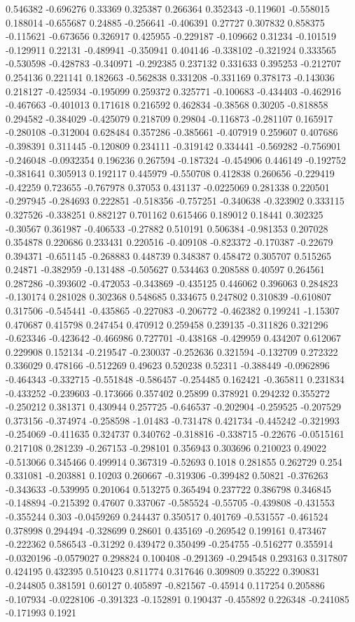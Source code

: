 0.546382 -0.696276 0.33369 0.325387 0.266364 0.352343 -0.119601 -0.558015 0.188014 -0.655687 0.24885 -0.256641 -0.406391 0.27727 0.307832 0.858375 -0.115621 -0.673656 0.326917 0.425955 -0.229187 -0.109662 0.31234 -0.101519 -0.129911 0.22131 -0.489941 -0.350941 0.404146 -0.338102 -0.321924 0.333565 -0.530598 -0.428783 -0.340971 -0.292385 0.237132 0.331633 0.395253 -0.212707 0.254136 0.221141 0.182663 -0.562838 0.331208 -0.331169 0.378173 -0.143036 0.218127 -0.425934 -0.195099 0.259372 0.325771 -0.100683 -0.434403 -0.462916 -0.467663 -0.401013 0.171618 0.216592 0.462834 -0.38568 0.30205 -0.818858 0.294582 -0.384029 -0.425079 0.218709 0.29804 -0.116873 -0.281107 0.165917 -0.280108 -0.312004 0.628484 0.357286 -0.385661 -0.407919 0.259607 0.407686 -0.398391 0.311445 -0.120809 0.234111 -0.319142 0.334441 -0.569282 -0.756901 -0.246048 -0.0932354 0.196236 0.267594 -0.187324 -0.454906 0.446149 -0.192752 -0.381641 0.305913 0.192117 0.445979 -0.550708 0.412838 0.260656 -0.229419 -0.42259 0.723655 -0.767978 0.37053 0.431137 -0.0225069 0.281338 0.220501 -0.297945 -0.284693 0.222851 -0.518356 -0.757251 -0.340638 -0.323902 0.333115 0.327526 -0.338251 0.882127 0.701162 0.615466 0.189012 0.18441 0.302325 -0.30567 0.361987 -0.406533 -0.27882 0.510191 0.506384 -0.981353 0.207028 0.354878 0.220686 0.233431 0.220516 -0.409108 -0.823372 -0.170387 -0.22679 0.394371 -0.651145 -0.268883 0.448739 0.348387 0.458472 0.305707 0.515265 0.24871 -0.382959 -0.131488 -0.505627 0.534463 0.208588 0.40597 0.264561 0.287286 -0.393602 -0.472053 -0.343869 -0.435125 0.446062 0.396063 0.284823 -0.130174 0.281028 0.302368 0.548685 0.334675 0.247802 0.310839 -0.610807 0.317506 -0.545441 -0.435865 -0.227083 -0.206772 -0.462382 0.199241 -1.15307 0.470687 0.415798 0.247454 0.470912 0.259458 0.239135 -0.311826 0.321296 -0.623346 -0.423642 -0.466986 0.727701 -0.438168 -0.429959 0.434207 0.612067 0.229908 0.152134 -0.219547 -0.230037 -0.252636 0.321594 -0.132709 0.272322 0.336029 0.478166 -0.512269 0.49623 0.520238 0.52311 -0.388449 -0.0962896 -0.464343 -0.332715 -0.551848 -0.586457 -0.254485 0.162421 -0.365811 0.231834 -0.433252 -0.239603 -0.173666 0.357402 0.25899 0.378921 0.294232 0.355272 -0.250212 0.381371 0.430944 0.257725 -0.646537 -0.202904 -0.259525 -0.207529 0.373156 -0.374974 -0.258598 -1.01483 -0.731478 0.421734 -0.445242 -0.321993 -0.254069 -0.411635 0.324737 0.340762 -0.318816 -0.338715 -0.22676 -0.0515161 0.217108 0.281239 -0.267153 -0.298101 0.356943 0.303696 0.210023 0.49022 -0.513066 0.345466 0.499914 0.367319 -0.52693 0.1018 0.281855 0.262729 0.254 0.331081 -0.203881 0.10203 0.260667 -0.319306 -0.399482 0.50821 -0.376263 -0.343633 -0.539995 0.201064 0.513275 0.365494 0.237722 0.386798 0.346845 -0.148894 -0.215392 0.47607 0.337067 -0.585524 -0.55705 -0.439808 -0.431553 -0.355244 0.303 -0.0459269 0.244437 0.350517 0.401769 -0.531557 -0.461524 0.378998 0.294494 -0.328699 0.28601 0.435169 -0.269542 0.199161 0.473467 -0.222362 0.586543 -0.31292 0.439472 0.350499 -0.254755 -0.516277 0.355914 -0.0320196 -0.0579027 0.298824 0.100408 -0.291369 -0.294548 0.293163 0.317807 0.424195 0.432395 0.510423 0.811774 0.317646 0.309809 0.35222 0.390831 -0.244805 0.381591 0.60127 0.405897 -0.821567 -0.45914 0.117254 0.205886 -0.107934 -0.0228106 -0.391323 -0.152891 0.190437 -0.455892 0.226348 -0.241085 -0.171993 0.1921 
